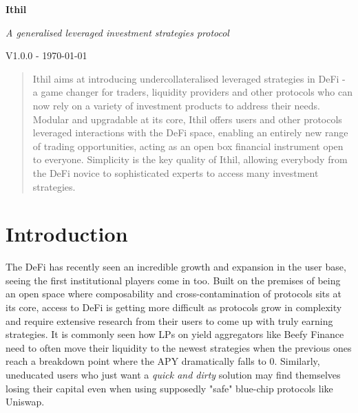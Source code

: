 \documentclass[a4paper,10 pt]{article}
\theoremstyle{definition}
\begin{document}
\begin{titlepage}
    \begin{center}
        \vspace*{1cm}
            
        \Huge
        \textbf{Ithil}

        \vspace{0.5cm}
        \Large
        {\it A generalised leveraged investment strategies protocol}

        \vspace{1.5cm}
        {\normalsize V1.0.0 - \today}
        \vspace{1.0cm}

        \begin{abstract}
        Ithil aims at introducing undercollateralised leveraged strategies in DeFi - a game changer for traders, liquidity providers and other protocols who can now rely on a variety of investment products to address their needs. Modular and upgradable at its core, Ithil offers users and other protocols leveraged interactions with the DeFi space, enabling an entirely new range of trading opportunities, acting as an open box financial instrument open to everyone. Simplicity is the key quality of Ithil, allowing everybody from the DeFi novice to sophisticated experts to access many investment strategies.
        \end{abstract}
            
    \end{center}
\end{titlepage}

\section{Introduction}

The DeFi has recently seen an incredible growth and expansion in the user base, seeing the first institutional players come in too. Built on the premises of being an open space where composability and cross-contamination of protocols sits at its core, access to DeFi is getting more difficult as protocols grow in complexity and require extensive research from their users to come up with truly earning strategies. It is commonly seen how LPs on yield aggregators like Beefy Finance need to often move their liquidity to the newest strategies when the previous ones reach a breakdown point where the APY dramatically falls to 0. Similarly, uneducated users who just want a {\it quick and dirty} solution may find themselves losing their capital even when using supposedly "safe" blue-chip protocols like Uniswap.
\end{document}
